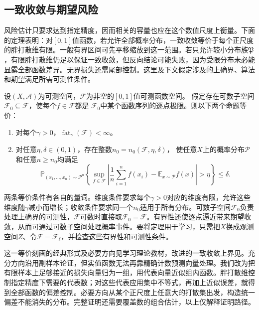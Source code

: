 \subsection{一致收敛与期望风险}

风险估计只要求达到指定精度，因而相关的容量也应在这个数值尺度上衡量。下面的定理表明：对$[0,1]$值函数，若允许全部概率分布，一致收敛等价于每个正尺度的胖打散维有限。一般有界区间可先平移缩放到这一范围。若只允许较小分布族$\mathfrak P$，有限胖打散维仍足以保证一致收敛，但反向结论可能失败，因为受限分布未必能显露全部函数差异。无界损失还需尾部控制。这里及下文假定涉及的上确界、算法和期望满足所需可测性条件。

\begin{theorem}[胖打散维与一致收敛]
\label{thm:fat-uniform-convergence}
设$(X,\mathcal A)$为可测空间，$\mathcal F$为非空的$[0,1]$值可测函数空间。
假定存在可数子空间$\mathcal F_0\subseteq\mathcal F$，使每个$f\in\mathcal F$都是
$\mathcal F_0$中某个函数序列的逐点极限。则以下两个命题等价：
\begin{enumerate}
 \item 对每个$\gamma>0$，$\operatorname{fat}_{\gamma}(\mathcal F)<\infty$。
 \item 对任意$\eta,\delta\in(0,1)$，存在整数$n_0=n_0(\mathcal F,\eta,\delta)$，
 使任意$X$上的概率分布$\mathcal P$和任意$n\geq n_0$均满足
 \[
 \mathbb P_{(x_1,\ldots,x_n)\sim\mathcal P^n}\!\left\{
 \sup_{f\in\mathcal F}
 \left|\frac1n\sum_{i=1}^n f(x_i)-\mathbb E_{x\sim\mathcal P}f(x)\right|
 >\eta\right\}\leq\delta.
 \]
\end{enumerate}
\end{theorem}

两条等价条件有各自的量词。维度条件要求每个$\gamma>0$对应的维度有限，允许这些维度随$\gamma$减小而增长；收敛条件要求同一个$n_0$适用于所有分布。可数子空间$\mathcal F_0$负责处理上确界的可测性，$\mathcal F$可数时直接取$\mathcal F_0=\mathcal F$。有界性还使逐点逼近带来期望收敛，从而可通过可数子空间处理概率事件。要将定理用于学习，只需把$X$换成观测空间$Z$、令$\mathcal F=\mathcal F_\ell$，并检查这些有界性和可测性条件。

这一等价刻画的经典形式及必要方向见学习理论教材，改进的一致收敛上界见。充分方向沿用副样本论证，但实值函数无法再靠精确计数预测向量处理。我们改为把有限样本上足够接近的损失向量归为一组，用代表向量近似组内函数。胖打散维控制指定精度下需要的代表数；对这些代表应用集中不等式，再加上近似误差，就得到全部函数的偏差控制。必要方向从某个正尺度上任意大的打散集出发，构造统一偏差不能消失的分布。完整证明还需要覆盖数的组合估计，以上仅解释证明路径。

